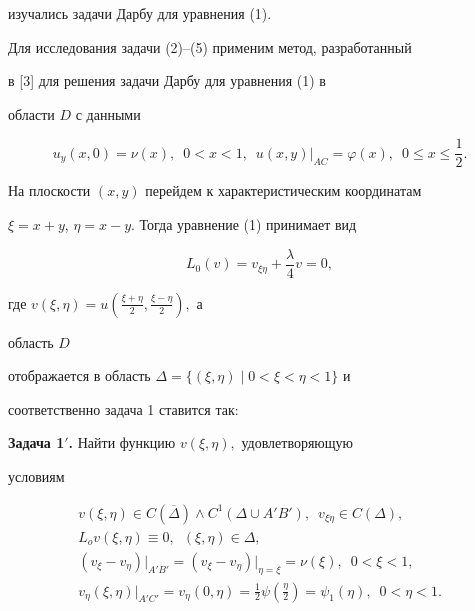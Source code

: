 изучались задачи Дарбу для уравнения (1).





Для исследования задачи (2)--(5) применим метод, разработанный


в [3] для решения задачи Дарбу для уравнения (1) в


области $D$ с данными


$$


u_y(x,0)=\nu(x),\ \; 0<x<1,\ \;u(x,y)\bigl|_{AC}=


\varphi(x),\ \;0\le x\le \frac{1}{2}.


$$





На плоскости $(x,y)$ перейдем к характеристическим координатам


$\xi=x+y$, $\eta =x-y$. Тогда уравнение (1) принимает вид


\begin{equation}


L_0(v)=v_{\xi\eta}+\frac{\lambda }{4}v=0,


\end{equation}


где $v(\xi,\eta)=u(\frac{\xi+\eta}{2},\frac{\xi-\eta}{2}),$ а


область $D$


отображается в область $\Delta=\{(\xi,\eta)\mid 0<\xi<\eta<1\}$ и


соответственно задача 1 ставится так:


\medskip





{\bf Задача 1$'$.} Найти функцию $v(\xi,\eta),$ удовлетворяющую


условиям


\begin{gather}


v(\xi,\eta)\in C(\overline \Delta)\land C^1(\Delta\cup


A'B'),\ \;v_{\xi\eta}\in C(\Delta), \\


%


L_ov(\xi,\eta)\equiv 0,\ \;(\xi,\eta) \in \Delta,\\


%


(v_\xi -v_\eta)\big|_{A'B'}=(v_\xi -v_\eta)\big


|_{\eta=\xi}=\nu(\xi),\ \;0<\xi <1,\\


%


v_\eta (\xi,\eta)\big|_{A'C'}=v_\eta(0,\eta )=\frac{1}{2}\psi


(\frac{\eta}{2})=\psi_1(\eta),\ \;0<\eta<1.


\end{gather}





